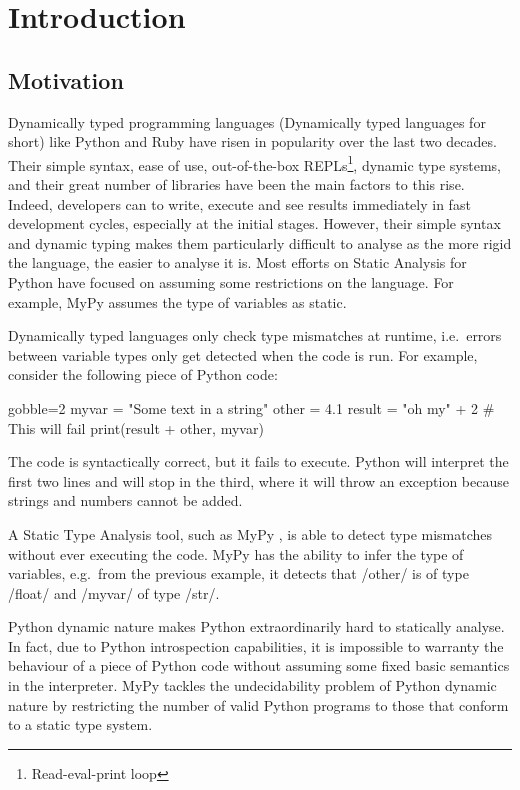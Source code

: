 \chapter{Introduction}\label{introduction}

\section{Motivation}\label{motivation}

Dynamically typed programming languages (Dynamically typed languages for short) like
Python and Ruby have risen in popularity over the last two decades. Their simple syntax,
ease of use, out-of-the-box REPLs\footnote{Read-eval-print loop}, dynamic type systems,
and their great number of libraries have been the main factors to this rise. Indeed,
developers can to write, execute and see results immediately in fast development cycles,
especially at the initial stages. However, their simple syntax and dynamic typing makes
them particularly difficult to analyse as the more rigid the language, the easier to
analyse it is. Most efforts on Static Analysis for Python have focused on assuming some
restrictions on the language. For example, MyPy \autocite{lehtosalo2016mypy} assumes the
type of variables as static.

Dynamically typed languages only check type mismatches at runtime, i.e.~errors between
variable types only get detected when the code is run. For example,
consider the following piece of Python code:

\begin{pythoncode*}{gobble=2}
  myvar = "Some text in a string"
  other = 4.1
  result = "oh my" + 2  # This will fail
  print(result + other, myvar)
\end{pythoncode*}

The code is syntactically correct, but it fails to execute. Python will interpret the first
two lines and will stop in the third, where it will throw an exception because strings
and numbers cannot be added.

A Static Type Analysis tool, such as MyPy \autocite{lehtosalo2016mypy}, is able to detect
type mismatches without ever executing the code.  MyPy has the ability to infer the type
of variables, e.g.~from the previous example, it detects that \pycode/other/ is of type
\pycode/float/ and \pycode/myvar/ of type \pycode/str/.

Python dynamic nature makes Python extraordinarily hard to statically analyse. In fact,
due to Python introspection capabilities, it is impossible to warranty the behaviour of a
piece of Python code without assuming some fixed basic semantics in the interpreter.  MyPy
tackles the undecidability problem of Python dynamic nature by restricting the number
of valid Python programs to those that conform to a static type system\footnotemark.

